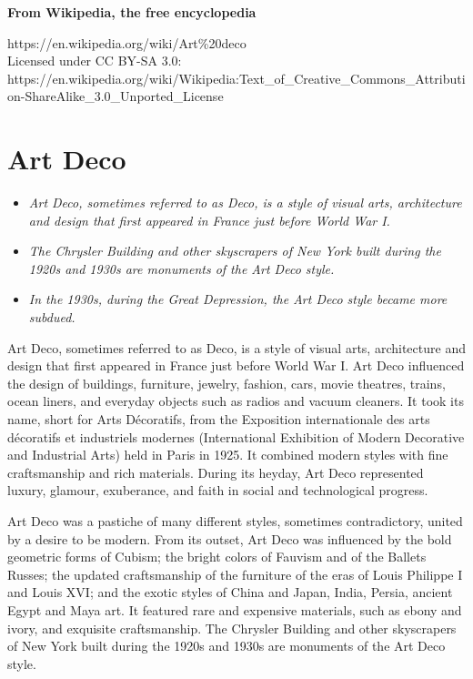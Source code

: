 \textbf{From Wikipedia, the free encyclopedia}

https://en.wikipedia.org/wiki/Art\%20deco\\
Licensed under CC BY-SA 3.0:\\
https://en.wikipedia.org/wiki/Wikipedia:Text\_of\_Creative\_Commons\_Attribution-ShareAlike\_3.0\_Unported\_License

\section{Art Deco}\label{art-deco}

\begin{itemize}
\item
  \emph{Art Deco, sometimes referred to as Deco, is a style of visual
  arts, architecture and design that first appeared in France just
  before World War I.}
\item
  \emph{The Chrysler Building and other skyscrapers of New York built
  during the 1920s and 1930s are monuments of the Art Deco style.}
\item
  \emph{In the 1930s, during the Great Depression, the Art Deco style
  became more subdued.}
\end{itemize}

Art Deco, sometimes referred to as Deco, is a style of visual arts,
architecture and design that first appeared in France just before World
War I. Art Deco influenced the design of buildings, furniture, jewelry,
fashion, cars, movie theatres, trains, ocean liners, and everyday
objects such as radios and vacuum cleaners. It took its name, short for
Arts Décoratifs, from the Exposition internationale des arts décoratifs
et industriels modernes (International Exhibition of Modern Decorative
and Industrial Arts) held in Paris in 1925. It combined modern styles
with fine craftsmanship and rich materials. During its heyday, Art Deco
represented luxury, glamour, exuberance, and faith in social and
technological progress.

Art Deco was a pastiche of many different styles, sometimes
contradictory, united by a desire to be modern. From its outset, Art
Deco was influenced by the bold geometric forms of Cubism; the bright
colors of Fauvism and of the Ballets Russes; the updated craftsmanship
of the furniture of the eras of Louis Philippe I and Louis XVI; and the
exotic styles of China and Japan, India, Persia, ancient Egypt and Maya
art. It featured rare and expensive materials, such as ebony and ivory,
and exquisite craftsmanship. The Chrysler Building and other skyscrapers
of New York built during the 1920s and 1930s are monuments of the Art
Deco style.

